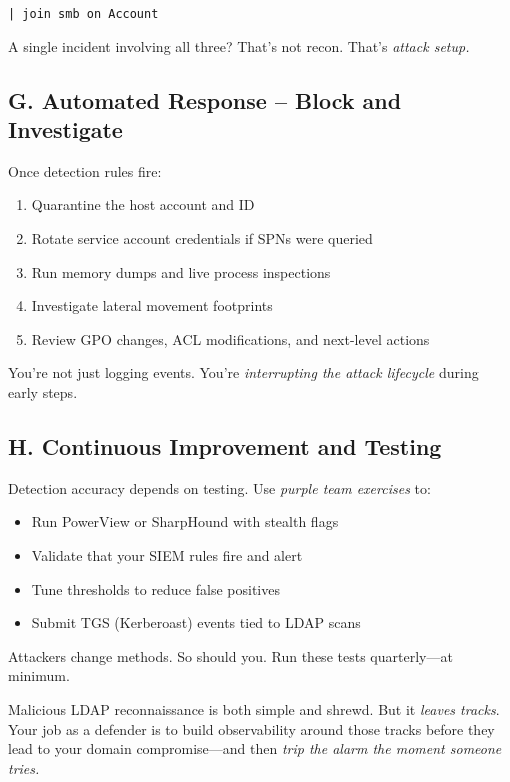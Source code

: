 {{\begin{verbatim}
| join smb on Account
\end{verbatim}

A single incident involving all three? That’s not recon. That’s \textit{attack setup.}

\subsection{G. Automated Response – Block and Investigate}

Once detection rules fire:

\begin{enumerate}
    \item Quarantine the host account and ID
    \item Rotate service account credentials if SPNs were queried
    \item Run memory dumps and live process inspections
    \item Investigate lateral movement footprints
    \item Review GPO changes, ACL modifications, and next-level actions
\end{enumerate}

You’re not just logging events. You’re \textit{interrupting the attack lifecycle} during early steps.

\subsection{H. Continuous Improvement and Testing}

Detection accuracy depends on testing. Use \textit{purple team exercises} to:

\begin{itemize}
    \item Run PowerView or SharpHound with stealth flags
    \item Validate that your SIEM rules fire and alert
    \item Tune thresholds to reduce false positives
    \item Submit TGS (Kerberoast) events tied to LDAP scans
\end{itemize}

Attackers change methods. So should you. Run these tests quarterly—at minimum.

Malicious LDAP reconnaissance is both simple and shrewd. But it \textit{leaves tracks}. Your job as a defender is to build observability around those tracks before they lead to your domain compromise—and then \textit{trip the alarm the moment someone tries.}

}}
